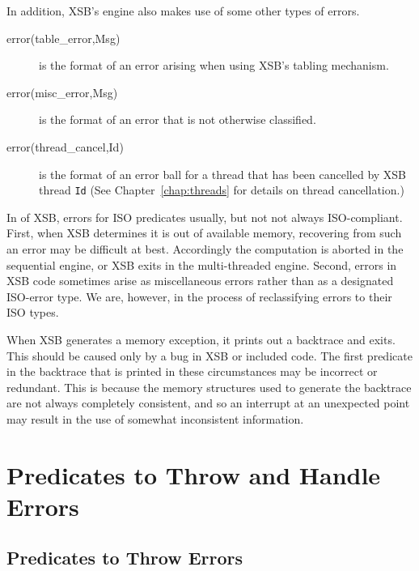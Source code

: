 In addition, XSB's engine also makes use of some other types of
errors.
%
\begin{description}
\item[error(table\_error,Msg)] is the format of an error arising when
  using XSB's tabling mechanism.
%
\item[error(misc\_error,Msg)] is the format of an error that is not
  otherwise classified.
%
\item[error(thread\_cancel,Id)] is the format of an error ball for a
  thread that has been cancelled by XSB thread {\tt Id} (See
  Chapter~\ref{chap:threads} for details on thread cancellation.)
%
\end{description}

In \version{} of XSB, errors for ISO predicates usually, but not not
always ISO-compliant.  First, when XSB determines it is out of
available memory, recovering from such an error may be difficult at
best.  Accordingly the computation is aborted in the sequential
engine, or XSB exits in the multi-threaded engine.  Second, errors in
XSB code sometimes arise as miscellaneous errors rather than as a
designated ISO-error type.  We are, however, in the process of
reclassifying errors to their ISO types.

When XSB generates a memory exception, it prints out a backtrace and
exits.  This should be caused only by a bug in XSB or included code.
The first predicate in the backtrace that is printed in these
circumstances may be incorrect or redundant.  This is because the
memory structures used to generate the backtrace are not always
completely consistent, and so an interrupt at an unexpected point may
result in the use of somewhat inconsistent information.

\section{Predicates to Throw and Handle Errors}
\label{sec:errorpredicates}

\subsection{Predicates to Throw Errors}

